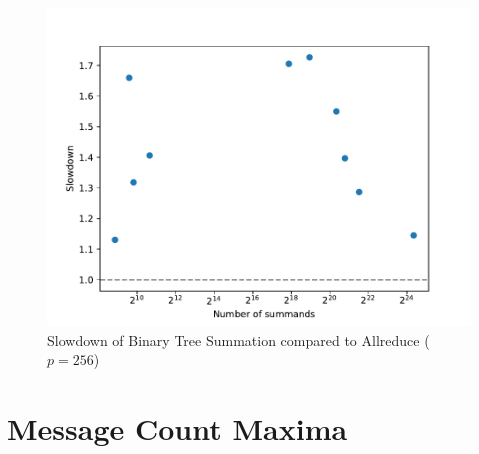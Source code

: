 \begin{figure}
\centering
\includegraphics[scale=\mScale]{figures/slowdownAllreduceTree.pdf}
\caption{Slowdown of Binary Tree Summation compared to Allreduce ($p = 256$)}
\label{fig:slowdownAllreduceTree}
\end{figure}


\section{Message Count Maxima}

